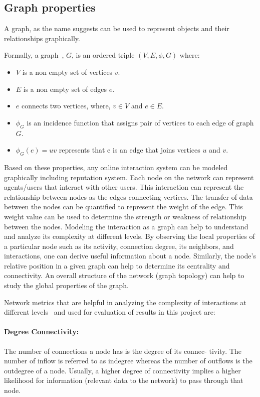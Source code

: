 \subsection{Graph properties}
A graph, as the name suggests can be used to represent objects and their
relationships graphically. \par
Formally, a graph~\cite{bondy1976graph}, $G$, is an ordered triple $(V,E,\phi,
G)$ where:
\begin{itemize}
	\item $V$ is a non empty set of vertices $v$.
	\item $E$ is a non empty set of edges $e$.
	\item $e$ connects two vertices, where, $v \in V$ and $e \in E$.
	\item $\phi_G$ is an incidence function that assigns pair of vertices to
		each edge of graph $G$. 
	\item $\phi_G(e) = uv$ represents that e is an edge that joins vertices $u$
		and $v$.
\end{itemize}
Based on these properties, any online interaction system can be modeled
graphically including reputation system. Each node on the network can represent
agents/users that interact with other users. This interaction can represent the
relationship between nodes as the edges connecting vertices. The transfer of
data between the nodes can be quantified to represent the weight of the edge.
This weight value can be used to determine the strength or weakness of
relationship between the nodes. Modeling the interaction as a graph can help to
understand and analyze its complexity at different levels. By observing the
local properties of a particular node such as its activity, connection degree,
its neighbors, and interactions, one can derive useful information about a
node. Similarly, the node’s relative position in a given graph can help to
determine its centrality and connectivity. An overall structure of the network
(graph topology) can help to study the global properties of the graph. \par
Network metrics that are helpful in analyzing the complexity of interactions at
different levels~\cite{gkorou2014exploiting} and used for evaluation of results
in this project are:
\paragraph{Degree Connectivity:} The number of connections a node has is the
degree of its connec- tivity. The number of inflow is referred to as indegree
whereas the number of outflows is the outdegree of a node. Usually, a higher
degree of connectivity implies a higher likelihood for information (relevant
data to the network) to pass through that node.  
